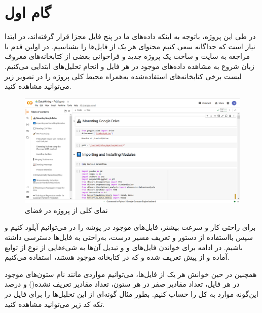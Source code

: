 \documentclass{article}
\begin{document}


\tableofcontents
\newpage

\section{گام اول}  
در طی این پروژه، باتوجه به اینکه داده‌های ما در پنج فایل مجزا قرار گرفته‌اند، در ابتدا نیاز است که جداگانه سعی کنیم محتوای هر یک از فایل‌ها را بشناسیم.
در اولین قدم با مراجعه به سایت  و ساخت یک پروژه جدید و فراخوانی بعضی از کتابخانه‌های معروف زبان  شروع به مشاهده داده‌های موجود در هر فایل و انجام تحلیل‌های ابتدایی می‌کنیم.
لیست برخی کتابخانه‌های استفاده‌شده به‌همراه محیط کلی پروژه را در تصویر زیر می‌توانید مشاهده کنید.
\begin{figure}[ht]
        \centering
        \includegraphics[width=1\textwidth]{project-1.png}
        \caption{نمای کلی از پروژه  در فضای }
        \label{fig:fig1}
    \end{figure}

برای راحتی کار و سرعت بیشتر، فایل‌های موجود در پوشه  را در  می‌توانیم آپلود کنیم و سپس بااستفاده از دستور  و تعریف مسیر درست، به‌راحتی به فایل‌ها دسترسی داشته‌ باشیم.
در ادامه برای خواندن فایل‌های  و  و تبدیل آن‌ها به شیء‌هایی از نوع  از توابع آماده و از پیش‌ تعریف شده  و  که در کتابخانه  موجود هستند، استفاده می‌کنیم.

\newpage
همچنین در حین خوانش هر یک از فایل‌ها، می‌توانیم مواردی مانند نام ستون‌های موجود در هر فایل، تعداد مقادیر صفر در هر ستون، تعداد مقادیر تعریف نشده() و درصد این‌گونه موارد به کل را حساب کنیم. بطور مثال گونه‌ای از این تحلیل‌ها را برای فایل  در تکه کد زیر می‌توانید مشاهده کنید.

\lr{}
\end{document}
